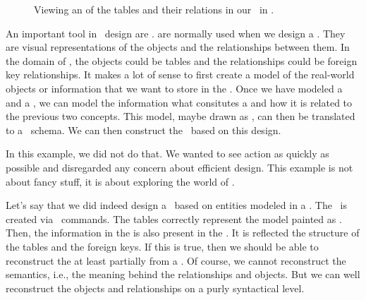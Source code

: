 %
%
\FloatBarrier%
%
\begin{figure}%
\centering%
%
%
%
\floatSep%
%
%
%
\floatRowSep%
%
%
%
%
\caption{Viewing an  of the tables and their relations in our \db\ in \libreofficeBase.}%
\label{fig:factoryLibreOfficeBaseERD}%
%
\end{figure}%
%
An important tool in \db\ design are .
 are normally used when we design a \db.
They are visual representations of the objects and the relationships between them.
In the domain of \dbs, the objects could be tables and the relationships could be foreign key relationships.
It makes a lot of sense to first create a model of the real-world objects or information that we want to store in the \db.
Once we have modeled a  and a , we can model the information what consitutes a  and how it is related to the previous two concepts.
This model, maybe drawn as , can then be translated to a \db\ schema.
We can then construct the \db\ based on this design.

In this example, we did not do that.
We wanted to see action as quickly as possible and disregarded any concern about efficient design.
This example is not about fancy stuff, it is about exploring the world of \dbs.

Let's say that we did indeed design a \db\ based on entities modeled in a .
The \db\ is created via \sql\ commands.
The tables correctly represent the model painted as .
Then, the information in the  is also present in the \db.
It is reflected the structure of the tables and the foreign keys.
If this is true, then we should be able to reconstruct the  at least partially from a \db.
Of course, we cannot reconstruct the semantics, i.e., the meaning behind the relationships and objects.
But we can well reconstruct the objects and relationships on a purly syntactical level.

